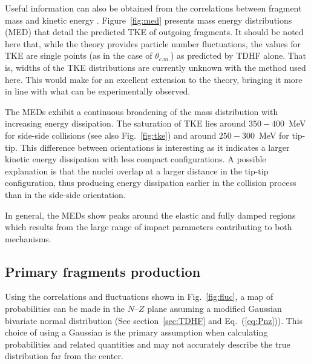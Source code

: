 \documentclass[reprint,aps,prc,twocolumn,superscriptaddress,floatfix,10pt]{revtex4-2}
\begin{document}
Useful information can also be obtained from the correlations between fragment mass and kinetic energy \cite{itkis2004,itkis2011,itkis2015,kozulin2019,banerjee2019}.
Figure~\ref{fig:med} presents mass energy distributions (MED) that detail the predicted TKE of outgoing fragments.
It should be noted here that, while the theory provides particle number fluctuations, the values for TKE are single points (as in the case of $\theta_{c.m.}$) as predicted by TDHF alone.
That is, widths of the TKE distributions are currently unknown with the method used here.
This would make for an excellent extension to the theory, bringing it more in line with what can be experimentally observed.

The MEDs exhibit a continuous broadening of the mass distribution with increasing energy dissipation. 
The saturation of TKE lies around $350-400$~MeV for side-side collisions (see also Fig.~\ref{fig:tke}) and around $250-300$~MeV for tip-tip. 
This difference between orientations is interesting as it indicates a larger kinetic energy dissipation with less compact configurations. 
 A possible explanation is that the nuclei overlap at a larger distance in the tip-tip configuration, thus producing energy dissipation earlier in the collision process than in the side-side orientation. 
 
In general, the MEDs show peaks around the elastic and fully damped regions which results from the large range of impact parameters contributing to both mechanisms.

\subsection{Primary fragments production}

Using the  correlations and fluctuations shown in Fig.~\ref{fig:fluc}, a map of probabilities can be made in the $N$--$Z$ plane assuming a modified Gaussian bivariate normal distribution (See section~\ref{sec:TDHF} and Eq.~(\ref{eq:Pnz})).
This choice of using a Gaussian is the primary assumption when calculating probabilities and related quantities and may not accurately describe the true distribution far from the center.
\end{document}
